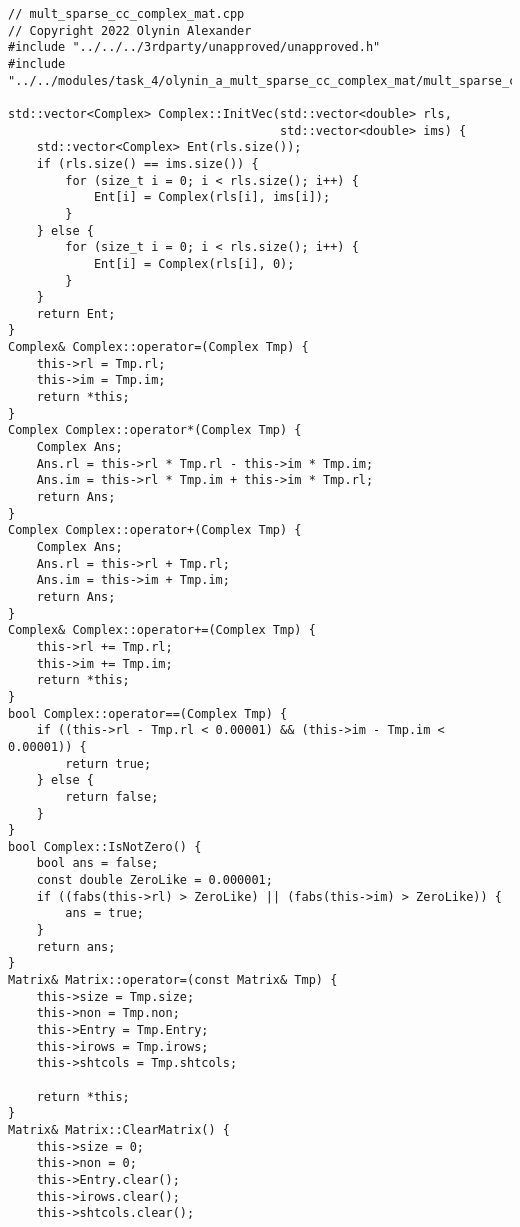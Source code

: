\documentclass[12pt]{report}
\begin{document}
\begin{lstlisting}
// mult_sparse_cc_complex_mat.cpp
// Copyright 2022 Olynin Alexander
#include "../../../3rdparty/unapproved/unapproved.h"
#include "../../modules/task_4/olynin_a_mult_sparse_cc_complex_mat/mult_sparse_cc_complex_mat.h"

std::vector<Complex> Complex::InitVec(std::vector<double> rls,
                                      std::vector<double> ims) {
    std::vector<Complex> Ent(rls.size());
    if (rls.size() == ims.size()) {
        for (size_t i = 0; i < rls.size(); i++) {
            Ent[i] = Complex(rls[i], ims[i]);
        }
    } else {
        for (size_t i = 0; i < rls.size(); i++) {
            Ent[i] = Complex(rls[i], 0);
        }
    }
    return Ent;
}
Complex& Complex::operator=(Complex Tmp) {
    this->rl = Tmp.rl;
    this->im = Tmp.im;
    return *this;
}
Complex Complex::operator*(Complex Tmp) {
    Complex Ans;
    Ans.rl = this->rl * Tmp.rl - this->im * Tmp.im;
    Ans.im = this->rl * Tmp.im + this->im * Tmp.rl;
    return Ans;
}
Complex Complex::operator+(Complex Tmp) {
    Complex Ans;
    Ans.rl = this->rl + Tmp.rl;
    Ans.im = this->im + Tmp.im;
    return Ans;
}
Complex& Complex::operator+=(Complex Tmp) {
    this->rl += Tmp.rl;
    this->im += Tmp.im;
    return *this;
}
bool Complex::operator==(Complex Tmp) {
    if ((this->rl - Tmp.rl < 0.00001) && (this->im - Tmp.im < 0.00001)) {
        return true;
    } else {
        return false;
    }
}
bool Complex::IsNotZero() {
    bool ans = false;
    const double ZeroLike = 0.000001;
    if ((fabs(this->rl) > ZeroLike) || (fabs(this->im) > ZeroLike)) {
        ans = true;
    }
    return ans;
}
Matrix& Matrix::operator=(const Matrix& Tmp) {
    this->size = Tmp.size;
    this->non = Tmp.non;
    this->Entry = Tmp.Entry;
    this->irows = Tmp.irows;
    this->shtcols = Tmp.shtcols;

    return *this;
}
Matrix& Matrix::ClearMatrix() {
    this->size = 0;
    this->non = 0;
    this->Entry.clear();
    this->irows.clear();
    this->shtcols.clear();


\end{lstlisting}
\end{document}
